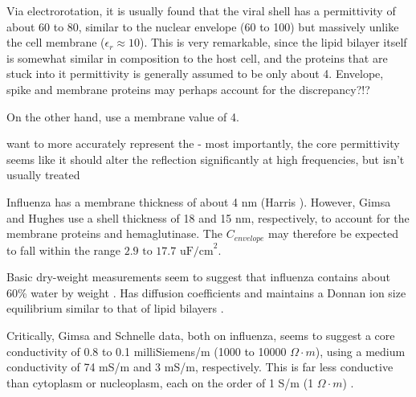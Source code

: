 \documentclass[fleqn,10pt]{paper}
\begin{document}
Via electrorotation, it is usually found that the viral shell has a permittivity of about 60 to 80, similar to the nuclear envelope (60 to 100) but massively unlike the cell membrane ($\epsilon_r\approx 10$). This is very remarkable, since the lipid bilayer itself is somewhat similar in composition to the host cell, and the proteins that are stuck into it permittivity is generally assumed to be only about 4. Envelope, spike and membrane proteins may perhaps account for the discrepancy?!?

On the other hand, \cite{Electrostatic2020a} use a membrane value of 4.

want to more accurately represent the - most importantly, the core permittivity seems like it should alter the reflection significantly at high frequencies, but isn't usually treated 

Influenza has a membrane thickness of about 4 nm (Harris \cite{Influenza2006}). However, Gimsa and Hughes use a shell thickness of 18 and 15 nm, respectively, to account for the membrane proteins and hemaglutinase. The $C_{envelope}$ may therefore be expected to fall within the range $2.9 \text{ to } 17.7 \text{ uF/cm}^2$.

Basic dry-weight measurements seem to suggest that influenza contains about 60\% water by weight \cite{lauffer1944biophysical}. Has diffusion coefficients and maintains a Donnan ion size equilibrium similar to that of lipid bilayers \cite{Effect2015b}.


% 



Critically, Gimsa and Schnelle data, both on influenza, seems to suggest a core conductivity of 0.8 to 0.1 milliSiemens/m (1000 to 10000 $\Omega \cdot m$), using a medium conductivity of 74 mS/m and 3 mS/m, respectively. This is far less conductive than cytoplasm or nucleoplasm, each on the order of 1 S/m (1 $\Omega \cdot m$) \cite{Study2001}. 
\end{document}

